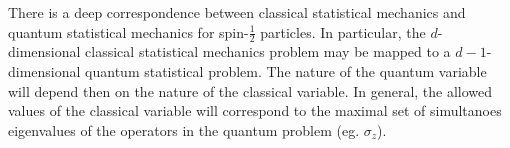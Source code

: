 \documentclass{homework}
\begin{document}







There is a deep correspondence between classical statistical mechanics and quantum statistical mechanics for spin-$\frac{1}{2}$ particles. In particular, the $d$-dimensional classical statistical mechanics problem may be mapped to a $d-1$-dimensional quantum statistical problem. The nature of the quantum variable will depend then on the nature of the classical variable. In general, the allowed values of the classical variable will correspond to the maximal set of simultanoes eigenvalues of the operators in the quantum problem (eg. $\sigma_z$). 
\end{document}
